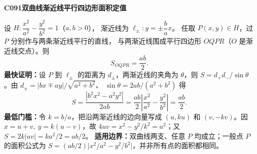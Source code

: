 \textbf{C091\quad 双曲线渐近线平行四边形面积定值}

设 $H:\dfrac{x^2}{a^2}-\dfrac{y^2}{b^2}=1$（$a,b>0$），
渐近线为 $\ell_\pm:y=\pm\dfrac ba x$。
任取 $P(x,y)\in H$，过 $P$ 分别作与两条渐近线平行的直线，
与两渐近线围成平行四边形 $OQPR$（$O$ 是渐近线交点）。则
\[
\boxed{S_{OQPR}=\frac{ab}{2}}.
\]
\textbf{最快证明：}设 $P$ 到 $\ell_\pm$ 的距离为 $d_\pm$，两渐近线的夹角为 $\theta$，则
$S=d_+d_-/\sin\theta$。由
$d_\pm=|bx\mp ay|/\sqrt{a^2+b^2}$、
$\sin\theta=2ab/(a^2+b^2)$ 得
\[
S=\frac{|b^2x^2-a^2y^2|}{2ab}
=\frac{ab}{2}\left|\frac{x^2}{a^2}-\frac{y^2}{b^2}\right|
=\frac{ab}{2}.
\]
\textbf{最低门槛：}令 $k=b/a$，把沿两渐近线的边向量写成
$(u,ku)$ 和 $(v,-kv)$。因 $x=u+v,\ y=k(u-v)$，故
$4uv=x^2-y^2/k^2=a^2$；又 $S=2k|uv|=ka^2/2=ab/2$。
\textbf{适用边界：}双曲线两支、任意 $P$ 均成立；一般点 $P$ 的面积公式为
$S=(ab/2)\bigl|x^2/a^2-y^2/b^2\bigr|$，并非所有点的面积都相同。
